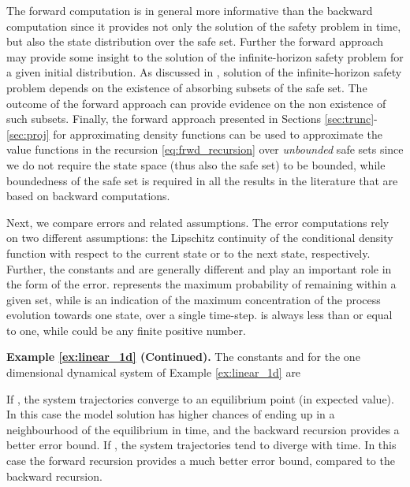 \documentclass{LMCS}
\begin{document}
The forward computation is in general more informative than the backward computation since it provides not only the solution of the safety problem in time, but also the state distribution over the safe set.
Further the forward approach may provide some insight to the solution of the infinite-horizon safety problem \cite{ta2011,TA14} for a given initial distribution. 
As discussed in \cite{TA14},
solution of the infinite-horizon safety problem depends on the existence of absorbing subsets of the safe set. 
The outcome of the forward approach can provide evidence on the non existence of such subsets.
Finally, the forward approach presented in Sections \ref{sec:trunc}-\ref{sec:proj} for approximating density functions can be used to approximate the value functions in the recursion \eqref{eq:frwd_recursion} over \emph{unbounded} safe sets since we do not require the state space (thus also the safe set) to be bounded, 
while boundedness of the safe set is required in all the results in the literature that are based on backward computations. 

Next, we compare errors and related assumptions. 
The error computations
rely on two different assumptions: 
the Lipschitz continuity of the conditional density function with respect to the current state or to the next state, respectively.  
Further, 
the constants  and  are generally different and play an important role in the form of the error. 
 represents the maximum probability of remaining within a given set, 
while  is an indication of the maximum concentration of the process evolution towards one state, over a single time-step. 
 is always less than or equal to one, while  could be any finite positive number.

\medskip

\noindent\textbf{\textbf{Example \ref{ex:linear_1d} (Continued).}}
The constants  and  for the one dimensional dynamical system of Example \ref{ex:linear_1d} are

If , 
the system trajectories converge to an equilibrium point (in expected value). 
In this case the model solution has higher chances of ending up in a neighbourhood of the equilibrium in time, 
and the backward recursion provides a better error bound. 
If , 
the system trajectories tend to diverge with time. 
In this case the forward recursion provides a much better error bound, 
compared to the backward recursion. 
\end{document}
